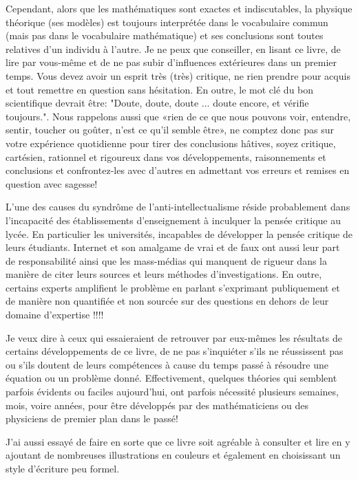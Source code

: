 	Cependant, alors que les math\'ematiques sont exactes et indiscutables, la physique th\'eorique (ses modèles) est toujours interpr\'et\'ee dans le vocabulaire commun (mais pas dans le vocabulaire math\'ematique) et ses conclusions sont toutes relatives d'un individu à l'autre. Je ne peux que conseiller, en lisant ce livre, de lire par vous-même et de ne pas subir d'influences ext\'erieures dans un premier temps. Vous devez avoir un esprit très (très) critique, ne rien prendre pour acquis et tout remettre en question sans h\'esitation. En outre, le mot cl\'e du bon scientifique devrait être: "Doute, doute, doute ... doute encore, et v\'erifie toujours.". Nous rappelons aussi que «rien de ce que nous pouvons voir, entendre, sentir, toucher ou goûter, n'est ce qu'il semble être», ne comptez donc pas sur votre exp\'erience quotidienne pour tirer des conclusions hâtives, soyez critique, cart\'esien, rationnel et rigoureux dans vos d\'eveloppements, raisonnements et conclusions et confrontez-les avec d'autres en admettant vos erreurs et remises en question avec sagesse!
	
	\begin{tcolorbox}[title=Remarque,colframe=black,arc=10pt]
	L'une des causes du syndrôme de l'anti-intellectualisme r\'eside probablement dans l'incapacit\'e des \'etablissements d'enseignement à inculquer la pens\'ee critique au lyc\'ee. En particulier les universit\'es, incapables de d\'evelopper la pens\'ee critique de leurs \'etudiants. Internet et son amalgame de vrai et de faux ont aussi leur part de responsabilit\'e ainsi que les mass-m\'edias qui manquent de rigueur dans la manière de citer leurs sources et leurs m\'ethodes d'investigations. En outre, certains experts amplifient le problème en parlant s'exprimant publiquement et de manière non quantifi\'ee et non sourc\'ee sur des questions en dehors de leur domaine d'expertise !!!!
	\end{tcolorbox}
	Je veux dire à ceux qui essaieraient de retrouver par eux-mêmes les r\'esultats de certains d\'eveloppements de ce livre, de ne pas s'inqui\'eter s'ils ne r\'eussissent pas ou s'ils doutent de leurs comp\'etences à cause du temps pass\'e à r\'esoudre une \'equation ou un problème donn\'e. Effectivement, quelques th\'eories qui semblent parfois \'evidents ou faciles aujourd'hui, ont parfois n\'ecessit\'e plusieurs semaines, mois, voire ann\'ees, pour être d\'evelopp\'es par des math\'ematiciens ou des physiciens de premier plan dans le pass\'e!
	
	J'ai aussi essay\'e de faire en sorte que ce livre soit agr\'eable à consulter et lire en y ajoutant de nombreuses illustrations en couleurs et \'egalement en choisissant un style d'\'ecriture peu formel.
	
